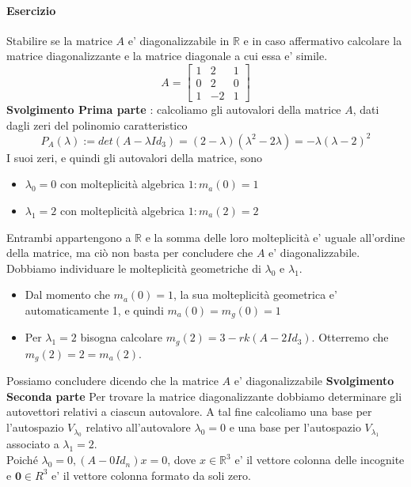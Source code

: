 \documentclass[a4paper, 10pt]{article}
\begin{document}
	\paragraph*{Esercizio}
	Stabilire se la matrice $A$ e' diagonalizzabile in $\mathbb{R}$ e in caso affermativo calcolare la matrice 
	diagonalizzante e la matrice diagonale a cui essa e' simile. 
	\[ A = \begin{bmatrix} 1 & 2 & 1 \\ 0 & 2 & 0 \\ 1 & -2 & 1 \end{bmatrix} \]
	\textbf{Svolgimento Prima parte} : 
	calcoliamo gli autovalori della matrice $A$, dati dagli zeri del polinomio caratteristico
	\[ P_A(\lambda) := det(A - \lambda Id_3) = (2 - \lambda)(\lambda^2 - 2\lambda) = -\lambda(\lambda - 2)^2 \]
	I suoi zeri, e quindi gli autovalori della matrice, sono
	\begin{itemize}
		\item $\lambda_0 = 0$ con molteplicità algebrica $1 : m_a(0) = 1$
		\item $\lambda_1 = 2$ con molteplicità algebrica $1 : m_a(2) = 2$
	\end{itemize}
	Entrambi appartengono a $\mathbb{R}$ e la somma delle loro molteplicità e' uguale all'ordine della matrice, ma ciò non
	basta per concludere che $A$ e' diagonalizzabile. Dobbiamo individuare le molteplicità geometriche di $\lambda_0$ e 
	$\lambda_1$. 
	\begin{itemize}
		\item Dal momento che $m_a(0) = 1$, la sua molteplicità geometrica e' automaticamente 1, e quindi 
		$m_a(0) = m_g(0) = 1$
		\item Per $\lambda_1 = 2$ bisogna calcolare $m_g(2) = 3 - rk( A - 2Id_3)$. Otterremo che $m_g(2) = 2 = m_a(2)$.
	\end{itemize}
	Possiamo concludere dicendo che la matrice $A$ e' diagonalizzabile  \newpage 
	\textbf{Svolgimento Seconda parte}
	Per trovare la matrice diagonalizzante dobbiamo determinare gli autovettori relativi a ciascun autovalore. 
	A tal fine calcoliamo una base per l'autospazio $V_{\lambda_0}$ relativo all'autovalore $\lambda_0 = 0$ e una base 
	per l'autospazio $V_{\lambda_1}$ associato a $\lambda_1 = 2$. \\
	Poiché $\lambda_0 = 0, (A - 0Id_n)x = 0$, dove $x \in \mathbb{R}^3$ e' 
	il vettore colonna delle incognite e $\textbf{0} \in R^3$ e' il vettore colonna formato da soli zero. 
\end{document}
